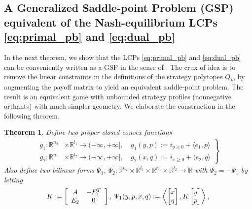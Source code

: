 \documentclass[a4paper,9pt]{extarticle}
\newtheorem{theorem}{Theorem}
\begin{document}
\subsection{A Generalized Saddle-point Problem (GSP) equivalent of
  the Nash-equilibrium LCPs \eqref{eq:primal_pb} and
  \eqref{eq:dual_pb}}
In the next theorem, we show that the LCPs \eqref{eq:primal_pb}
and \eqref{eq:dual_pb} can be
conveniently written as a GSP in the sense of
\cite{he2013accelerating}. The crux of idea is to remove the linear
constraints in the definitions of the strategy polytopes $Q_k$, by
augmenting the payoff matrix to yield an equivalent saddle-point
problem. The result is an equivalent game with unbounded strategy
profiles (nonnegative orthants) with much simpler geometry.
We elaborate the construction in the following theorem.
\begin{theorem}
Define two proper closed convex functions
  \begin{eqnarray}
    \left.
    \begin{aligned}
      g_1: \mathbb{R}^{n_2} &\times \mathbb{R}^{l_1} \rightarrow
      (-\infty, +\infty], \hspace{1em} g_1(y, p) :=
        i_{y \ge 0} + \langle e_1,p\rangle\\
        g_2: \mathbb{R}^{n_1} &\times \mathbb{R}^{l_2} \rightarrow
        (-\infty, +\infty],\hspace{1em} g_2(x, q) :=
          i_{x \ge 0} + \langle e_2, q\rangle
    \end{aligned}
    \right\}
    \label{eq:things}
  \end{eqnarray}
Also define two bilinear forms $\Psi_1$, $\Psi_2: \mathbb{R}^{n_2}
\times \mathbb{R}^{l_1} \times \mathbb{R}^{n_1} \times
\mathbb{R}^{l_2} \rightarrow \mathbb{R}$ with $\Psi_2 = -\Psi_1$ by letting
\begin{equation}
  \begin{split}  
    K :=
    \left[
      \begin{array}{cc}
        A & -E_1^T \\
        E_2 & 0
      \end{array}
      \right],\hspace{.2em}
    \Psi_1(y, p, x, q)
    := \left\langle \begin{bmatrix}x\\q\end{bmatrix},
      K\begin{bmatrix}y\\p\end{bmatrix}\right\rangle, %

\end{split}
\end{equation}
\end{theorem}
\end{document}
